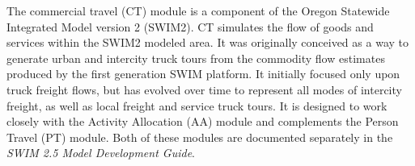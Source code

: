 
\noindent The commercial travel (CT) module is a component of the Oregon Statewide Integrated Model version 2 (SWIM2). CT simulates the flow of goods and services within the SWIM2 modeled area. It was originally conceived as a way to generate urban and intercity truck tours from the commodity flow estimates produced by the first generation SWIM platform. It initially focused only upon truck freight flows, but has evolved over time to represent all modes of intercity freight, as well as local freight and service truck tours. It is designed to work closely with the Activity Allocation (AA) module and complements the Person Travel (PT) module. Both of these modules are documented separately in the \textit{SWIM 2.5 Model Development Guide}.

